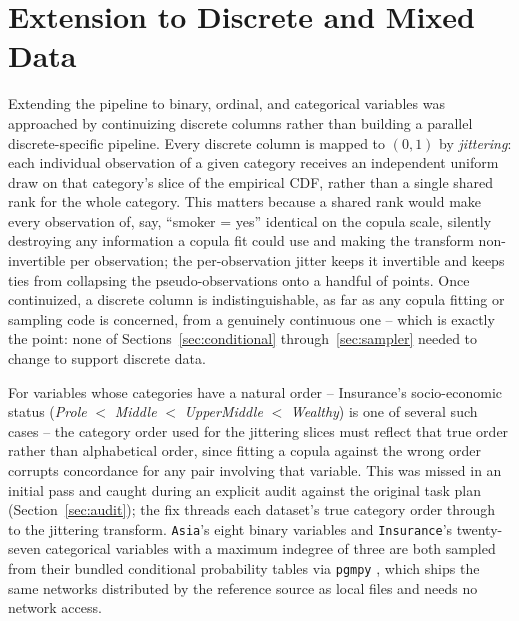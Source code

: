 \documentclass[
  english,
  class=report,
  accentcolor=2c,
  marginpar=false,
  parskip=half-,
  fontsize=11pt,
  ruledheaders=false,
  pdfa=false,
  IMRAD=false,
  thesis={type=master}
]{tudapub}
\begin{document}
\section{Extension to Discrete and Mixed Data}
\label{sec:discrete-method}
Extending the pipeline to binary, ordinal, and categorical variables was
approached by continuizing discrete columns rather than building a
parallel discrete-specific pipeline. Every discrete column is mapped to
$(0,1)$ by \emph{jittering}: each individual observation of a given category
receives an independent uniform draw on that category's slice of the
empirical CDF, rather than a single shared rank for the whole category. This
matters because a shared rank would make every observation of, say,
``smoker = yes'' identical on the copula scale, silently destroying any
information a copula fit could use and making the transform non-invertible
per observation; the per-observation jitter keeps it invertible and keeps
ties from collapsing the pseudo-observations onto a handful of points. Once
continuized, a discrete column is indistinguishable, as far as any copula
fitting or sampling code is concerned, from a genuinely continuous one --
which is exactly the point: none of Sections~\ref{sec:conditional}
through~\ref{sec:sampler} needed to change to support discrete data.

For variables whose categories have a natural order -- Insurance's
socio-economic status (\emph{Prole} $<$ \emph{Middle} $<$ \emph{UpperMiddle}
$<$ \emph{Wealthy}) is one of several such cases -- the category order used
for the jittering slices must reflect that true order rather than
alphabetical order, since fitting a copula against the wrong order corrupts
concordance for any pair involving that variable. This was missed in an
initial pass and caught during an explicit audit against the original task
plan (Section~\ref{sec:audit}); the fix threads each dataset's true
category order through to the jittering transform. \texttt{Asia}'s eight
binary variables \parencite{lauritzen1988} and \texttt{Insurance}'s
twenty-seven categorical variables with a maximum indegree of three
\parencite{binder1997} are both sampled from their bundled conditional
probability tables via \texttt{pgmpy} \parencite{ankan2015}, which ships the
same networks distributed by the reference source as local files and needs
no network access.
\end{document}

